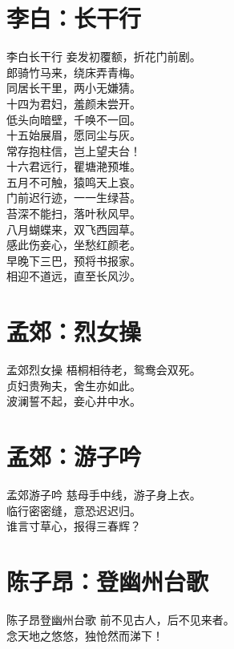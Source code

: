 \documentclass[12pt,oneside,a5paper]{book}
\begin{document}
\chapter{李白：长干行}
\begin{poemzh}{李白}{长干行}
妾发初覆额，折花门前剧。\\
郎骑竹马来，绕床弄青梅。\\
同居长干里，两小无嫌猜。\\
十四为君妇，羞颜未尝开。\\
低头向暗壁，千唤不一回。\\
十五始展眉，愿同尘与灰。\\
常存抱柱信，岂上望夫台！\\
十六君远行，瞿塘滟预堆。\\
五月不可触，猿鸣天上哀。\\
门前迟行迹，一一生绿苔。\\
苔深不能扫，落叶秋风早。\\
八月蝴蝶来，双飞西园草。\\
感此伤妾心，坐愁红颜老。\\
早晚下三巴，预将书报家。\\
相迎不道远，直至长风沙。\\ 
\end{poemzh}

\chapter{孟郊：烈女操}
\begin{poemzh}{孟郊}{烈女操}
梧桐相待老，鸳鸯会双死。\\
贞妇贵殉夫，舍生亦如此。\\
波澜誓不起，妾心井中水。\\ 
\end{poemzh}

\chapter{孟郊：游子吟}
\begin{poemzh}{孟郊}{游子吟}
慈母手中线，游子身上衣。\\
临行密密缝，意恐迟迟归。\\
谁言寸草心，报得三春辉？\\ 
\end{poemzh}

\chapter{陈子昂：登幽州台歌}
\begin{poemzh}{陈子昂}{登幽州台歌}
前不见古人，后不见来者。\\
念天地之悠悠，独怆然而涕下！\\ 
\end{poemzh}
\end{document}
